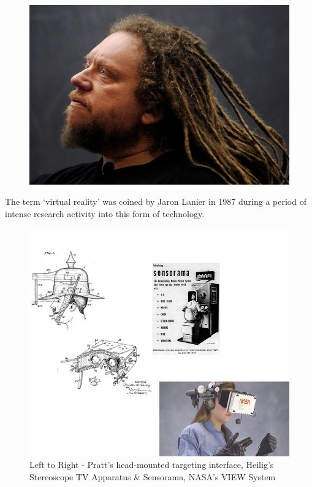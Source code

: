 \begin{frame}
	\begin{figure}
		\includegraphics[scale=0.3]{assets/lanier.jpg}
	\end{figure}
	The term `virtual reality' was coined by Jaron Lanier in 1987 during a period of intense research activity into this form of technology.
	
\end{frame}

\begin{frame}
	\begin{figure}
		\includegraphics[scale=.6]{assets/history.png}
		\caption{\tiny{Left to Right - Pratt's head-mounted targeting interface, Heilig's Stereoscope TV Apparatus \& Sensorama, NASA's VIEW System} }
	\end{figure}
\end{frame}

